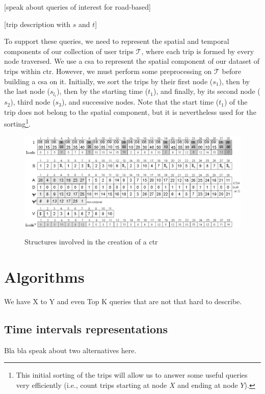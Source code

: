 \documentclass[a4paper,10pt,twoside]{book}
\begin{document}
	[speak about queries of interest for road-based]
	
	[trip description with $s$ and $t$]
	
    To support these queries, we need to represent the spatial and temporal components of our collection of user trips $\mathcal{T}$, where each trip is formed by every node traversed. We use a \gls{csa} to represent the spatial component of our dataset of trips within \gls{ctr}. However, we must perform some preprocessing on $\mathcal{T}$ before building a \gls{csa} on it. Initially, we sort the trips by their first node ($s_1$), then by the last node ($s_{l_i}$), then by the starting time ($t_1$), and finally, by its second node ($s_2$), third node ($s_3$), and successive nodes. Note that the start time ($t_1$) of the trip does not belong to the spatial component, but it is nevertheless used for the sorting\footnote{This initial sorting of the trips will allow us to answer some useful queries very efficiently  (i.e., count trips starting at node $X$ and ending at node $Y$).}.
	
	\begin{figure}[h!]
      \begin{center}
      {\includegraphics[width=1.00\textwidth]{figures/csttr.eps}}
      \end{center}
      \caption{Structures involved in the creation of a \acrshort{ctr}}
      \label{fig:tcsa}
    \end{figure}
	
	\section{Algorithms}
	We have X to Y and even Top K queries that are not that hard to describe.
	
	\subsection{Time intervals representations}
	Bla bla speak about two alternatives here.
	
\end{document}
